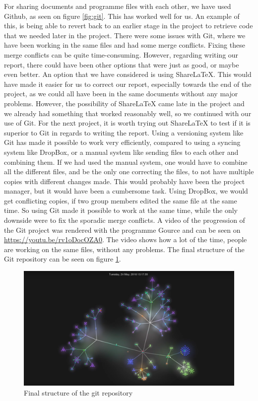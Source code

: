For sharing documents and programme files with each other, we have used Github, as seen on figure \ref{fig:git}.
This has worked well for us. 
An example of this, is being able to revert back to an earlier stage in the project to retrieve code that we needed later in the project.
There were some issues with Git, where we have been working in the same files and had some merge conflicts.
Fixing these merge conflicts can be quite time-consuming.
However, regarding writing our report, there could have been other options that were just as good, or maybe even better.
An option that we have considered is using ShareLaTeX.
This would have made it easier for us to correct our report, especially towards the end of the project, as we could all have been in the same documents without any major problems.
However, the possibility of ShareLaTeX came late in the project and we already had something that worked reasonably well, so we continued with our use of Git.
For the next project, it is worth trying out ShareLaTeX to test if it is superior to Git in regards to writing the report.
Using a versioning system like Git has made it possible to work very efficiently, compared to using a syncing system like DropBox, or a manual system like sending files to each other and combining them.
If we had used the manual system, one would have to combine all the different files, and be the only one correcting the files, to not have multiple copies with different changes made.
This would probably have been the project manager, but it would have been a cumbersome task.
Using DropBox, we would get conflicting copies, if two group members edited the same file at the same time.
So using Git made it possible to work at the same time, while the only downside were to fix the sporadic merge conflicts. 
A video of the progression of the Git project was rendered with the programme Gource and can be seen on \url{https://youtu.be/rv1oDocOZA0}. 
The video shows how a lot of the time, people are working on the same files, without any problems. 
The final structure of the Git repository can be seen on figure \ref{gittree}.

\begin{figure}
	\centering
	\includegraphics[width=\textwidth]{figures/gittree.png}
	\caption{Final structure of the git repository}
	\label{gittree}
\end{figure}
 

